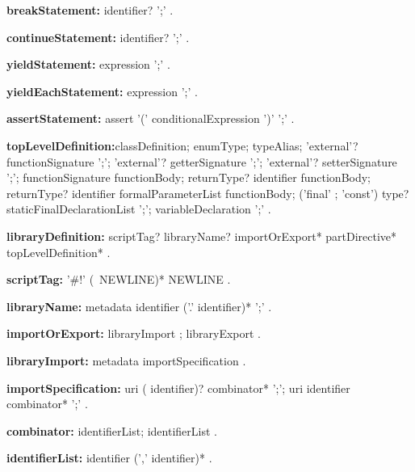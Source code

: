 \begin{grammar}
{\bf breakStatement:}
    \BREAK{} identifier? ';'
    .
\end{grammar}
\begin{grammar}
{\bf continueStatement:}
    \CONTINUE{} identifier? ';'
    .
\end{grammar}
\begin{grammar}
{\bf yieldStatement:}
    \YIELD{} expression ';'
    .
\end{grammar}
\begin{grammar}
{\bf yieldEachStatement:}
    \YIELD* expression ';'
    .
\end{grammar}
\begin{grammar}
{\bf assertStatement:}
    assert '(' conditionalExpression ')' ';'
    .
\end{grammar}
\begin{grammar}

{\bf topLevelDefinition:}classDefinition;
    enumType;
    typeAlias;
    'external'? functionSignature ';';
    'external'? getterSignature ';';
    'external'? setterSignature ';';      
    functionSignature functionBody;
    returnType? \GET{} identifier functionBody;
    returnType? \SET{} identifier formalParameterList functionBody;
    ('final' ; 'const') type? staticFinalDeclarationList ';';
    variableDeclaration ';'
    .

{\bf libraryDefinition:}
    scriptTag? libraryName? importOrExport* partDirective* topLevelDefinition*
    .
    
{\bf scriptTag:}
    '\#!' (~NEWLINE)* NEWLINE
    .

{\bf libraryName:}
    metadata \LIBRARY{} identifier ('.' identifier)* ';'
    .

{\bf importOrExport:}
    libraryImport ;
    libraryExport
    .
\end{grammar}
\begin{grammar}
{\bf libraryImport:}
    metadata importSpecification
    .
 
{\bf importSpecification:}
    \IMPORT{}  uri (\AS{} identifier)?  combinator* ';';
    \IMPORT{}  uri \DEFERRED{} \AS{} identifier  combinator* ';'
    .
     
{\bf combinator:}
    \SHOW{} identifierList;
    \HIDE{} identifierList
    .
    
{\bf identifierList:}
    identifier (',' identifier)*
    .
\end{grammar}
